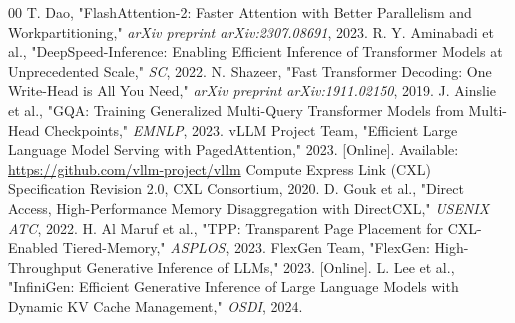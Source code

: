 \documentclass[10pt,conference]{IEEEtran}
\begin{document}
\begin{thebibliography}{00}
 T. Dao, "FlashAttention-2: Faster Attention with Better Parallelism and Workpartitioning," \textit{arXiv preprint arXiv:2307.08691}, 2023.
 R. Y. Aminabadi et al., "DeepSpeed-Inference: Enabling Efficient Inference of Transformer Models at Unprecedented Scale," \textit{SC}, 2022.
 N. Shazeer, "Fast Transformer Decoding: One Write-Head is All You Need," \textit{arXiv preprint arXiv:1911.02150}, 2019.
 J. Ainslie et al., "GQA: Training Generalized Multi-Query Transformer Models from Multi-Head Checkpoints," \textit{EMNLP}, 2023.
 vLLM Project Team, "Efficient Large Language Model Serving with PagedAttention," 2023. [Online]. Available: \url{https://github.com/vllm-project/vllm}
 Compute Express Link (CXL) Specification Revision 2.0, CXL Consortium, 2020.
 D. Gouk et al., "Direct Access, High-Performance Memory Disaggregation with DirectCXL," \textit{USENIX ATC}, 2022.
 H. Al Maruf et al., "TPP: Transparent Page Placement for CXL-Enabled Tiered-Memory," \textit{ASPLOS}, 2023.
 FlexGen Team, "FlexGen: High-Throughput Generative Inference of LLMs," 2023. [Online].
 L. Lee et al., "InfiniGen: Efficient Generative Inference of Large Language Models with Dynamic KV Cache Management," \textit{OSDI}, 2024.
\end{thebibliography}
\end{document}
